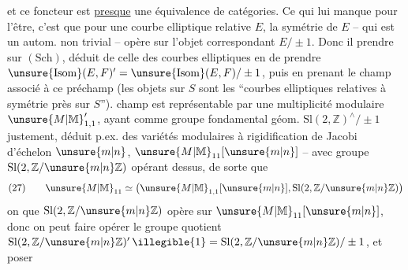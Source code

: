 et ce foncteur est \uline{presque} une équivalence de catégories. Ce qui lui manque pour l'être, c'est que pour une courbe elliptique relative $E$, la symétrie  de $E$ -- qui est un autom. non trivial -- opère  sur l'objet correspondant $E/\pm1$. Donc il  prendre    sur $(\mathrm{Sch})$, déduit de celle des courbes elliptiques en  de prendre $\unsure{\mathrm{Isom}}(E,F)'=\unsure{\mathrm{Isom}}(E,F)/\pm1$, puis en prenant le champ associé à ce préchamp (les objets sur $S$ sont les ``courbes elliptiques relatives à symétrie près sur $S$'').  champ est représentable par une multiplicité modulaire $\unsure{M|\mathbb M}'_{1,1}$,  ayant comme groupe fondamental géom. $\mathrm{Sl}(2,\mathbb{Z})^{\wedge}/\pm1$ justement, déduit  p.ex. des variétés modulaires à rigidification de Jacobi d'échelon $\unsure{m|n}$, $\unsure{M|\mathbb M}_{11}[\unsure{m|n}]$ -- avec groupe $\mathrm{Sl}(2,\mathbb{Z}/\unsure{m|n}\mathbb{Z})$ opérant dessus, de sorte que
\[
 (27)\qquad \unsure{M|\mathbb M}_{11}\simeq \bigl(\unsure{M|\mathbb M}_{1,1}[\unsure{m|n}],\mathrm{Sl}(2,\mathbb{Z}/\unsure{m|n}\mathbb{Z})\bigr)
\]
on  que  $\mathrm{Sl}(2,\mathbb{Z}/\unsure{m|n}\mathbb{Z})$ opère  sur $\unsure{M|\mathbb M}_{11}[\unsure{m|n}]$, donc on peut faire opérer le groupe quotient $\mathrm{Sl}(2,\mathbb{Z}/\unsure{m|n}\mathbb{Z})'\,\illegible{1}=\mathrm{Sl}(2,\mathbb{Z}/\unsure{m|n}\mathbb{Z})/\pm1$, et poser


